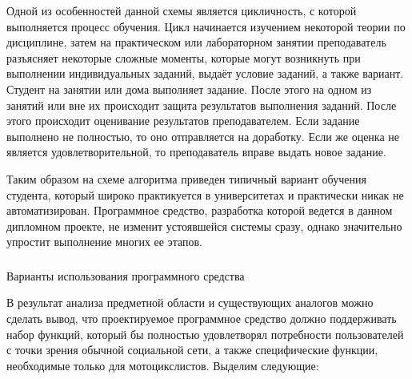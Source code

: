 Одной из особенностей данной схемы является цикличность, с которой выполняется процесс обучения. Цикл начинается изучением некоторой теории по дисциплине, затем на практическом или лабораторном занятии преподаватель разъясняет некоторые сложные моменты, которые могут возникнуть при выполнении индивидуальных заданий, выдаёт условие заданий, а также вариант. Студент на занятии или дома выполняет задание. После этого на одном из занятий или вне их происходит защита результатов выполнения заданий. После этого происходит оценивание результатов преподавателем. Если задание выполнено не полностью, то оно отправляется на доработку. Если же оценка не является удовлетворительной, то преподаватель вправе выдать новое задание.

Таким образом на схеме алгоритма приведен типичный вариант обучения студента, который широко практикуется в университетах и практически никак не автоматизирован. Программное средство, разработка которой ведется в данном дипломном проекте, не изменит устоявшейся системы сразу, однако значительно упростит выполнение многих ее этапов.

\subsubsection{} Варианты использования программного средства
\label{sec:domain:model:use_cases}

В результат анализа предметной области и существующих аналогов можно сделать вывод, что проектируемое программное средство должно поддерживать набор функций, который бы полностью удовлетворял потребности пользователей с точки зрения обычной социальной сети, а также специфические функции, необходимые только для мотоцикслистов. Выделим следующие:

